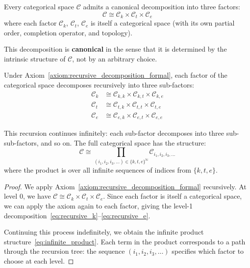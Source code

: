 \begin{axiom}
\label{axiom:recursive_decomposition_formal}
Every categorical space $\mathcal{C}$ admits a canonical decomposition into three factors:
\begin{equation}
\mathcal{C} \cong \mathcal{C}_k \times \mathcal{C}_t \times \mathcal{C}_e
\label{eq:recursive_decomposition}
\end{equation}
where each factor $\mathcal{C}_k$, $\mathcal{C}_t$, $\mathcal{C}_e$ is itself a categorical space (with its own partial order, completion operator, and topology).

This decomposition is \textbf{canonical} in the sense that it is determined by the intrinsic structure of $\mathcal{C}$, not by an arbitrary choice.
\end{axiom}

\begin{theorem}
\label{thm:recursive_self_similarity_formal}
Under Axiom~\ref{axiom:recursive_decomposition_formal}, each factor of the categorical space decomposes recursively into three sub-factors:
\begin{align}
\mathcal{C}_k &\cong \mathcal{C}_{k,k} \times \mathcal{C}_{k,t} \times \mathcal{C}_{k,e} \label{eq:recursive_k} \\
\mathcal{C}_t &\cong \mathcal{C}_{t,k} \times \mathcal{C}_{t,t} \times \mathcal{C}_{t,e} \label{eq:recursive_t} \\
\mathcal{C}_e &\cong \mathcal{C}_{e,k} \times \mathcal{C}_{e,t} \times \mathcal{C}_{e,e} \label{eq:recursive_e}
\end{align}

This recursion continues infinitely: each sub-factor decomposes into three sub-sub-factors, and so on. The full categorical space has the structure:
\begin{equation}
\mathcal{C} \cong \prod_{(i_1, i_2, i_3, \ldots) \in \{k,t,e\}^{\mathbb{N}}} \mathcal{C}_{i_1, i_2, i_3, \ldots}
\label{eq:infinite_product}
\end{equation}
where the product is over all infinite sequences of indices from $\{k, t, e\}$.
\end{theorem}

\begin{proof}
We apply Axiom~\ref{axiom:recursive_decomposition_formal} recursively. At level 0, we have $\mathcal{C} \cong \mathcal{C}_k \times \mathcal{C}_t \times \mathcal{C}_e$. Since each factor is itself a categorical space, we can apply the axiom again to each factor, giving the level-1 decomposition~\eqref{eq:recursive_k}--\eqref{eq:recursive_e}.

Continuing this process indefinitely, we obtain the infinite product structure~\eqref{eq:infinite_product}. Each term in the product corresponds to a path through the recursion tree: the sequence $(i_1, i_2, i_3, \ldots)$ specifies which factor to choose at each level.
\end{proof}

